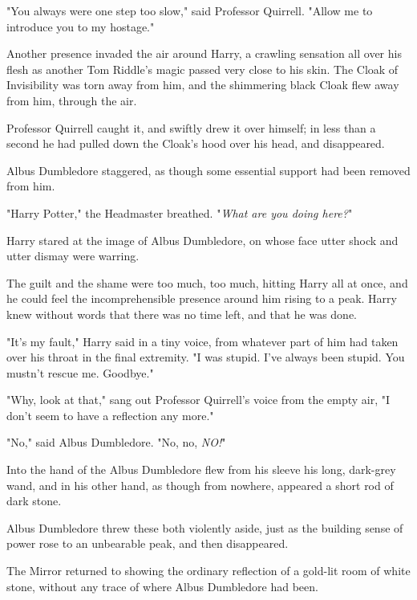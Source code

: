 "You always were one step too slow," said Professor Quirrell. "Allow me to
introduce you to my hostage."

Another presence invaded the air around Harry, a crawling sensation all over
his flesh as another Tom Riddle's magic passed very close to his skin. The
Cloak of Invisibility was torn away from him, and the shimmering black Cloak
flew away from him, through the air.

Professor Quirrell caught it, and swiftly drew it over himself; in less than a
second he had pulled down the Cloak's hood over his head, and disappeared.

Albus Dumbledore staggered, as though some essential support had been removed
from him.

"Harry Potter," the Headmaster breathed. "\emph{What are you doing here?}"

Harry stared at the image of Albus Dumbledore, on whose face utter shock and
utter dismay were warring.

The guilt and the shame were too much, too much, hitting Harry all at once, and
he could feel the incomprehensible presence around him rising to a peak. Harry
knew without words that there was no time left, and that he was done.

"It's my fault," Harry said in a tiny voice, from whatever part of him had
taken over his throat in the final extremity. "I was stupid. I've always been
stupid. You mustn't rescue me. Goodbye."

"Why, look at that," sang out Professor Quirrell's voice from the empty air, "I
don't seem to have a reflection any more."

"No," said Albus Dumbledore. "No, no, \emph{NO!}"

Into the hand of the Albus Dumbledore flew from his sleeve his long, dark-grey
wand, and in his other hand, as though from nowhere, appeared a short rod of
dark stone.

Albus Dumbledore threw these both violently aside, just as the building sense
of power rose to an unbearable peak, and then disappeared.

The Mirror returned to showing the ordinary reflection of a gold-lit room of
white stone, without any trace of where Albus Dumbledore had been.
